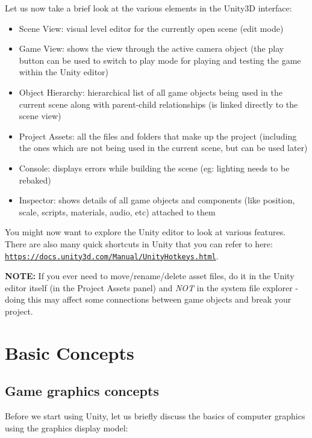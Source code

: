 \documentclass{article}[a4paper,12pt]
\theoremstyle{definition}
\begin{document}
Let us now take a brief look at the various elements in the Unity3D interface:
\begin{itemize}
	\item Scene View: visual level editor for the currently open scene (edit mode)
	\item Game View: shows the view through the active camera object (the play button can be used to switch to play mode for playing and testing the game within the Unity editor)
	\item Object Hierarchy: hierarchical list of all game objects being used in the current scene along with parent-child relationships (is linked directly to the scene view)
	\item Project Assets: all the files and folders that make up the project (including the ones which are not being used in the current scene, but can be used later)
	\item Console: displays errors while building the scene (eg: lighting needs to be rebaked)
	\item Inspector: shows details of all game objects and components (like position, scale, scripts, materials, audio, etc) attached to them
\end{itemize}
You might now want to explore the Unity editor to look at various features. There are also many quick shortcuts in Unity that you can refer to here: \texttt{\href{https://docs.unity3d.com/Manual/UnityHotkeys.html}{https://docs.unity3d.com/Manual/UnityHotkeys.html}}.
\vspace{6pt}

\textbf{NOTE:} If you ever need to move/rename/delete asset files, do it in the Unity editor itself (in the Project Assets panel) and \textit{NOT} in the system file explorer - doing this may affect some connections between game objects and break your project.

\hrulefill
\pagebreak
\section{Basic Concepts}
\subsection{Game graphics concepts}
Before we start using Unity, let us briefly discuss the basics of computer graphics using the graphics display model:
\end{document}
